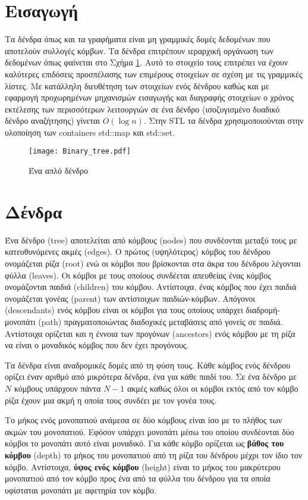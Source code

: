 \section{Εισαγωγή}
Τα δένδρα όπως και τα γραφήματα είναι μη γραμμικές δομές δεδομένων που αποτελούν συλλογές κόμβων. Τα δένδρα επιτρέπουν ιεραρχική οργάνωση των δεδομένων όπως φαίνεται στο Σχήμα \ref{fig:binary_tree}. Αυτό το στοιχείο τους επιτρέπει να έχουν καλύτερες επιδόσεις προσπέλασης των επιμέρους στοιχείων σε σχέση με τις γραμμικές λίστες. Με κατάλληλη διευθέτηση των στοιχείων ενός δένδρου καθώς και με εφαρμογή προχωρημένων μηχανισμών εισαγωγής και διαγραφής στοιχείων ο χρόνος εκτέλεσης των περισσότερων λειτουργιών σε ένα δένδρο (ισοζυγισμένο δυαδικό δένδρο αναζήτησης) γίνεται $O(\log n)$. Στην STL τα δένδρα χρησιμοποιούνται στην υλοποίηση των containers std::map και std::set.

\begin{figure}[htbp]
  \centering
  \texttt{[image: Binary\_tree.pdf]}
  \caption{Ένα απλό δένδρο \cite{wikipedia_binary_tree}}
  \label{fig:binary_tree}
\end{figure}

\section{Δένδρα}

Ένα δένδρο (tree) αποτελείται από κόμβους (nodes) που συνδέονται μεταξύ τους με κατευθυνόμενες ακμές (edges). Ο πρώτος (υψηλότερος) κόμβος του δένδρου ονομάζεται ρίζα (root) ενώ οι κόμβοι που βρίσκονται στα άκρα του δένδρου λέγονται φύλλα (leaves). Οι κόμβοι με τους οποίους συνδέεται απευθείας ένας κόμβος ονομάζονται παιδιά (children) του κόμβου. Αντίστοιχα, ένας κόμβος που έχει παιδιά ονομάζεται γονέας (parent) των αντίστοιχων παιδιών-κόμβων. Απόγονοι (descendants) ενός κόμβου είναι οι κόμβοι για τους οποίους υπάρχει διαδρομή-μονοπάτι (path) πραγματοποιώντας διαδοχικές μεταβάσεις από γονείς σε παιδιά. Αντίστοιχα ορίζεται και η έννοια των προγόνων (ancestors) ενός κόμβου με τη ρίζα να είναι ο μοναδικός κόμβος που δεν έχει προγόνους. 

Τα δένδρα είναι αναδρομικές δομές από τη φύση τους. Κάθε κόμβος ενός δένδρου ορίζει έναν αριθμό από μικρότερα δένδρα, ένα για κάθε παιδί του. Σε ένα δένδρο με $N$ κόμβους υπάρχουν πάντα $N-1$ ακμές καθώς όλοι οι κόμβοι εκτός από τον κόμβο ρίζα έχουν μια ακμή η οποία τους συνδέει με τον γονέα τους.

Το μήκος ενός μονοπατιού ανάμεσα σε δύο κόμβους είναι ίσο με το πλήθος των ακμών του μονοπατιού. Εφόσον υπάρχει μονοπάτι μέσω του οποίου συνδέονται δύο κόμβοι το μονοπάτι αυτό είναι μοναδικό. Για κάθε κόμβο ορίζεται ως \textbf{βάθος του κόμβου} (depth) το μήκος του μονοπατιού από τη ρίζα του δένδρου μέχρι τον ίδιο τον κόμβο. Αντίστοιχα, \textbf{ύψος ενός κόμβου} (height) είναι το μήκος του μακρύτερου μονοπατιού από τον κόμβο προς ένα από τα φύλλα του δένδρου για τα οποία υφίσταται μονοπάτι με αφετηρία τον κόμβο.


